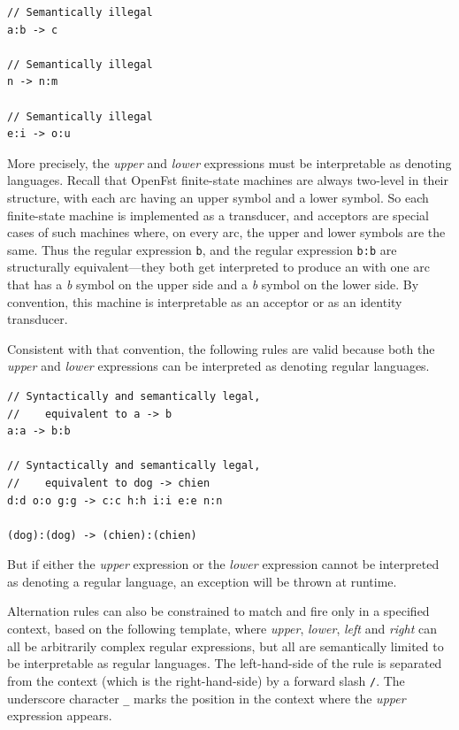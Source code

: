 \begin{Verbatim}
// Semantically illegal
a:b -> c

// Semantically illegal
n -> n:m

// Semantically illegal
e:i -> o:u
\end{Verbatim}


More precisely, the \emph{upper} and \emph{lower} expressions must be interpretable as denoting
languages.  Recall that OpenFst finite-state machines are always
two-level in their structure, with each arc having an
upper symbol and a lower symbol.  So each finite-state machine is implemented as a transducer, and
acceptors are special cases of such machines where, on every arc, the upper and lower symbols are the
same.  Thus the regular expression \texttt{b}, and the regular expression \texttt{b:b} are structurally
equivalent---they both get interpreted to produce an \fsm{} with one arc that has a \emph{b} symbol on
the upper side and a \emph{b} symbol on the lower side.  By convention,
this machine is interpretable as an acceptor or as an identity
transducer.

Consistent with that convention, the following rules are valid because both the \emph{upper} and
\emph{lower} expressions can be interpreted as denoting regular
languages.

\begin{Verbatim}
// Syntactically and semantically legal, 
//    equivalent to a -> b
a:a -> b:b

// Syntactically and semantically legal, 
//    equivalent to dog -> chien
d:d o:o g:g -> c:c h:h i:i e:e n:n

(dog):(dog) -> (chien):(chien)
\end{Verbatim}

\noindent
But if either the \emph{upper} expression or the \emph{lower} expression cannot be interpreted as
denoting a regular language, an exception will be thrown at runtime.

Alternation rules can also be constrained to match and fire only in a specified context, based on the following
template, where \emph{upper}, \emph{lower}, \emph{left} and \emph{right} can all be arbitrarily complex regular
expressions, but all are semantically limited to be interpretable as regular languages.  The left-hand-side of the rule
is separated from the context (which is the right-hand-side) by a forward slash \texttt{/}. The underscore character
\texttt{\_} marks the position in the context where the \emph{upper} expression appears.
 

